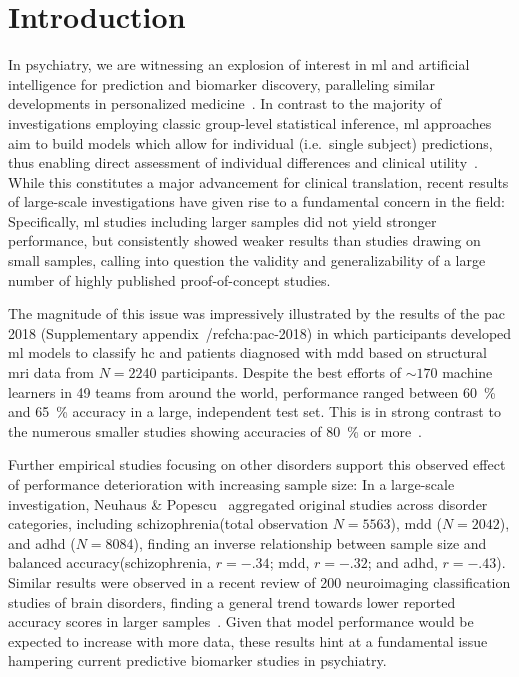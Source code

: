 \documentclass[12pt,a4paper]{article}
\begin{document}
    \section{Introduction}
    \acresetall
    In psychiatry, we are witnessing an explosion of interest in \ac{ml} and artificial intelligence for prediction and biomarker discovery, paralleling similar developments in personalized medicine~\cite{Darcy2016,Eyre2016,Gabrieli2015,Jordan2015}. In contrast to the majority of investigations employing classic group-level statistical inference, \ac{ml} approaches aim to build models which allow for individual (i.e.\ single subject) predictions, thus enabling direct assessment of individual differences and clinical utility~\cite{Hahn2017}. While this constitutes a major advancement for clinical translation, recent results of large-scale investigations have given rise to a fundamental concern in the field: Specifically, \ac{ml} studies including larger samples did not yield stronger performance, but consistently showed weaker results than studies drawing on small samples, calling into question the validity and generalizability of a large number of highly published proof-of-concept studies.

    The magnitude of this issue was impressively illustrated by the results of the \ac{pac} 2018 (Supplementary appendix~/ref{cha:pac-2018}) in which participants developed \ac{ml} models to classify \ac{hc} and patients diagnosed with \ac{mdd} based on structural \ac{mri} data from $N=\num{2240}$ participants. Despite the best efforts of $\sim\num{170}$ machine learners in \num{49} teams from around the world, performance ranged between \SI{60}{\percent} and \SI{65}{\percent} accuracy in a large, independent test set. This is in strong contrast to the numerous smaller studies showing accuracies of \SI{80}{\percent} or more~\cite{Johnston2015,Mwangi2012,Patel2015}.

    Further empirical studies focusing on other disorders support this observed effect of performance deterioration with increasing sample size: In a large-scale investigation, Neuhaus \& Popescu~\cite{Neuhaus2018} aggregated original studies across disorder categories, including schizophrenia(total observation $N=\num{5563}$), \ac{mdd} ($N=\num{2042}$), and \ac{adhd} ($N=\num{8084}$), finding an inverse relationship between sample size and balanced accuracy(schizophrenia, $r=\num{-.34}$; \ac{mdd}, $r=\num{-.32}$; and \ac{adhd}, $r=\num{-.43}$). Similar results were observed in a recent review of \num{200} neuroimaging classification studies of brain disorders, finding a general trend towards lower reported accuracy scores in larger samples~\cite{Arbabshirani2017}. Given that model performance would be expected to increase with more data, these results hint at a fundamental issue hampering current predictive biomarker studies in psychiatry.
\end{document}
